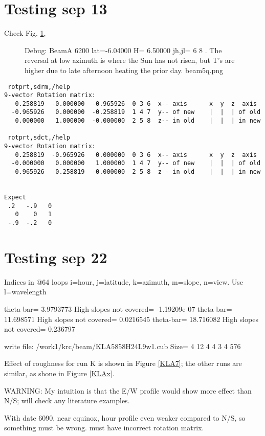 \documentclass{article}
\begin{document}
\section{Testing sep 13}

Check Fig. \ref{beam5q}, 
\begin{figure}[!ht] 
\caption[Ts vrs azimuth]{Debug: BeamA 6200 lat=-6.04000 H= 6.50000 jh,jl= 6 8 .
  The reversal at low azimuth is where the Sun has not risen, but T's are higher
  due to late afternoon heating the prior day.
\label{beam5q}  beam5q.png }
\end{figure} 

\begin{verbatim}
 rotprt,sdrm,/help
9-vector Rotation matrix:  
   0.258819  -0.000000  -0.965926  0 3 6  x-- axis      x  y  z  axis
  -0.965926   0.000000  -0.258819  1 4 7  y-- of new    |  |  | of old
   0.000000   1.000000  -0.000000  2 5 8  z-- in old    |  |  | in new

 rotprt,sdct,/help
9-vector Rotation matrix:  
   0.258819  -0.965926   0.000000  0 3 6  x-- axis      x  y  z  axis
  -0.000000   0.000000   1.000000  1 4 7  y-- of new    |  |  | of old
  -0.965926  -0.258819  -0.000000  2 5 8  z-- in old    |  |  | in new


Expect      
 .2   -.9   0    
   0    0   1 
 -.9  -.2   0

\end{verbatim} 

\section{Testing sep 22}
 Indices in @64 loops i=hour, j=latitude, k=azimuth, m=slope, n=view.
 Use l=wavelength



theta-bar=       3.9793773 High slopes not covered= -1.19209e-07
theta-bar=       11.698571 High slopes not covered=    0.0216545
theta-bar=       18.716082 High slopes not covered=     0.236797

write  file: /work1/krc/beam/KLA5858H24L9w1.cub Size=  4 12 4 4 3 4 576

Effect of roughness for run K is shown in Figure \ref{KLA7}; the other runs are
similar, as shone in Figure \ref{KLAx}.

WARNING: My intuition is that the E/W profile would show more effect than N/S;
will check any literature examples.

With date 6090, near equinox, hour profile even weaker compared to N/S,
 so something must be wrong. must have incorrect rotation matrix.
\end{document}
